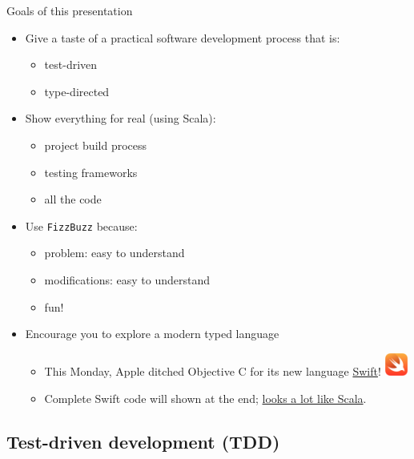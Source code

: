 \begin{frame}{Goals of this presentation}
  \begin{itemize}
  \item Give a taste of a \alert{practical} software development \alert{process} that is:
    \begin{itemize}
    \item \alert{test}-driven
    \item \alert{type}-directed
    \end{itemize}
  \item Show everything for real (using Scala):
    \begin{itemize}
    \item project build process
    \item testing frameworks
    \item all the code
    \end{itemize}
  \item Use \texttt{FizzBuzz} because:
    \begin{itemize}
    \item problem: easy to understand
    \item modifications: easy to understand
    \item fun!
    \end{itemize}
  \item Encourage you to explore a modern typed language
    \begin{itemize}
    \item This Monday, Apple ditched Objective C for its new language \href{https://developer.apple.com/swift/}{Swift}!
      \includegraphics[height=0.75cm]{swift-hero.png}
    \item Complete Swift code will shown at the end; \href{https://github.com/densh/talks/blob/master/swift-vs-scala-211-2014-06-03/Swift\%20vs\%20Scala\%202.11.pdf}{looks a lot like Scala}.
    \end{itemize}
  \end{itemize}
\end{frame}

\subsection{Test-driven development (TDD)}

